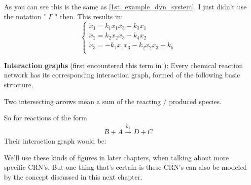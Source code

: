 As you can see this is the same as \ref{1st_example_dyn_system}, I just didn't use the notation " $\Gamma$ " then. This results in:
\[
	\begin{cases*}
		\dot{x}_1 = k_1 x_1 x_3 - k_3x_1  \\
		\dot{x}_2 = k_2 x_2 x_3 - k_4 x_2  \\
		\dot{x}_3 = -k_1 x_1 x_3 - k_2 x_2 x_3 + k_5 \\
	\end{cases*}
\]

\textbf{Interaction graphs} (first encountered this term in \cite{Derbez2015}): Every chemical reaction network has its corresponding interaction graph, formed of the following basic structure.

Two intersecting arrows mean a sum of the reacting / produced species.

So for reactions of the form
\begin{align*}
	B + A \xrightarrow{k_{1}} D + C
\end{align*}
Their interaction graph would be:

We'll use these kinds of figures in later chapters, when talking about more specific CRN's.
But one thing that's certain is these CRN's can also be modeled by the concept discussed in this next chapter.